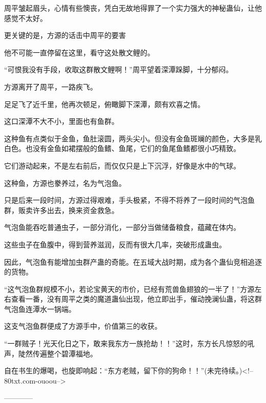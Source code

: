 \begin{this_body}
周平皱起眉头，心情有些懊丧，凭白无故地得罪了一个实力强大的神秘蛊仙，让他感觉不太好。

更关键的是，方源的话击中周平的要害

他不可能一直停留在这里，看守这处散文鲤的。

“可恨我没有手段，收取这群散文鲤啊！”周平望着深潭跺脚，十分郁闷。

方源离开了周平，一路疾飞。

足足飞了近千里，他再次顿足，俯瞰脚下深潭，颇有欢喜之情。

这口深潭不大不小，里面也有鱼群。

这种鱼有点类似于金鱼，鱼肚滚圆，两头尖小。但没有金鱼斑斓的颜色，大多是乳白色。也没有金鱼如裙摆般的鱼鳍、鱼尾，它们的鱼尾鱼鳍都很小巧精致。

它们游动起来，不是左右前后，而仅仅只是上下沉浮，好像是水中的气球。

这种鱼，方源也豢养过，名为气泡鱼。

只是后来一段时间，方源过得艰难，手头极紧，不得不将养了一段时间的气泡鱼群，贩卖许多出去，换来资金救急。

气泡鱼能吞吃普通虫子，一部分消化，一部分当做储备粮食，蕴藏在体内。

这些虫子在鱼腹中，得到营养滋润，反而有很大几率，突破形成蛊虫。

因此，气泡鱼有能增加虫群产蛊的奇能。在五域大战时期，成为各个蛊仙竞相追逐的货物。

“这气泡鱼群规模不小，若论宝黄天的市价，已经有荒兽鱼翅狼的一半了！”方源左右查看一番，没有周平之类的魔道蛊仙出现，他立即出手，催动挽澜仙蛊，将这群气泡鱼连潭水一锅端。

这支气泡鱼群便成了方源手中，价值第三的收获。

“一群贼子！光天化日之下，敢来我东方一族抢劫！！”这时，东方长凡惊怒的吼声，陡然传遍整个碧潭福地。

自在书生的爆喝，也旋即响起：“东方老贼，留下你的狗命！！”(未完待续。)<!--80txt.com-ouoou-->

------------

\end{this_body}

